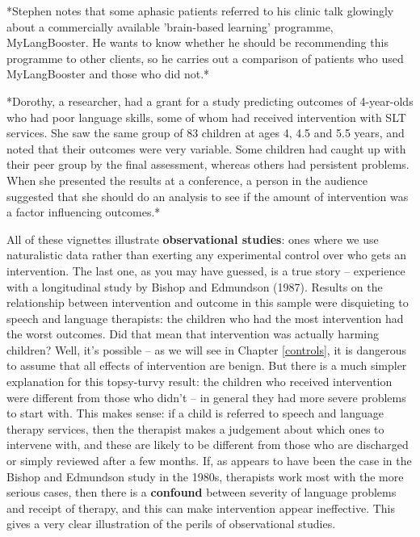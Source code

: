 \documentclass{krantz}
\begin{document}
\begin{shaded}
*Stephen notes that some aphasic patients referred to his clinic talk glowingly about a commercially available 'brain-based learning' programme, MyLangBooster. He wants to know whether he should be recommending this programme to other clients, so he carries out a comparison of patients who used MyLangBooster and those who did not.*
\end{shaded}

\begin{shaded}
*Dorothy, a researcher, had a grant for a study predicting outcomes of 4-year-olds who had poor language skills, some of whom had received intervention with SLT services. She saw the same group of 83 children at ages 4, 4.5 and 5.5 years, and noted that their outcomes were very variable. Some children had caught up with their peer group by the final assessment, whereas others had persistent problems. When she presented the results at a conference, a person in the audience suggested that she should do an analysis to see if the amount of intervention was a factor influencing outcomes.*
\end{shaded}

All of these vignettes illustrate \textbf{observational studies}: ones where we use naturalistic data rather than exerting any experimental control over who gets an intervention. The last one, as you may have guessed, is a true story -- experience with a longitudinal study by Bishop and Edmundson (1987). Results on the relationship between intervention and outcome in this sample were disquieting to speech and language therapists: the children who had the most intervention had the worst outcomes. Did that mean that intervention was actually harming children? Well, it's possible -- as we will see in Chapter \ref{controls}, it is dangerous to assume that all effects of intervention are benign. But there is a much simpler explanation for this topsy-turvy result: the children who received intervention were different from those who didn't -- in general they had more severe problems to start with. This makes sense: if a child is referred to speech and language therapy services, then the therapist makes a judgement about which ones to intervene with, and these are likely to be different from those who are discharged or simply reviewed after a few months. If, as appears to have been the case in the Bishop and Edmundson study in the 1980s, therapists work most with the more serious cases, then there is a \textbf{confound} between severity of language problems and receipt of therapy, and this can make intervention appear ineffective. This gives a very clear illustration of the perils of observational studies.
\end{document}

